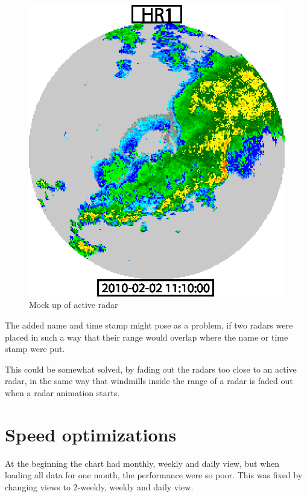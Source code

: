 \begin{figure}[htbp]
\begin{minipage}[b]{0.5\linewidth}
    \includegraphics[width=\linewidth]{figure/radar2.eps}
    \caption{Mock up of active radar}
    \label{fig:mock_up_active_radar}
  \end{minipage}
\end{figure}
The added name and time stamp might pose as a problem, if two radars were placed in such a way that their range would overlap where the name or time stamp were put.

This could be somewhat solved, by fading out the radars too close to an active radar, in the same way that windmills inside the range of a radar is faded out when a radar animation starts.

\section{Speed optimizations}
At the beginning the chart had monthly, weekly and daily view, but when loading all data for one month, the performance were so poor. This was fixed by changing views to 2-weekly, weekly and daily view.


